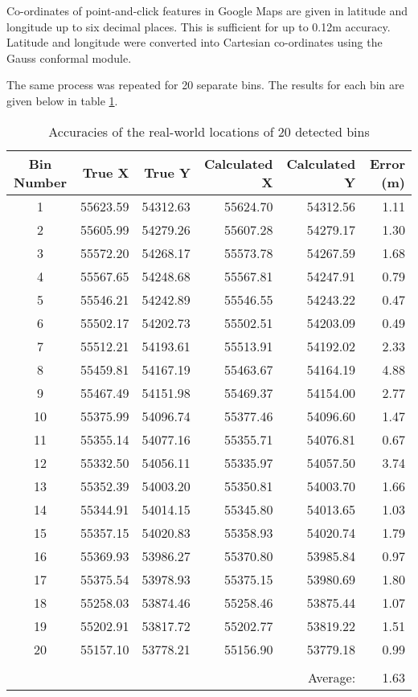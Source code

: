Co-ordinates of point-and-click features in Google Maps are given in latitude and longitude up to six decimal places. This is sufficient for up to 0.12m accuracy. Latitude and longitude were converted into Cartesian co-ordinates using the Gauss conformal module.

The same process was repeated for 20 separate bins. The results for each bin are given below in table \ref{tab:final_results}.

\begin{table}[H]
\caption[Final Results]{Accuracies of the real-world locations of 20 detected bins}
\label{tab:final_results}
\centering
\begin{tabular}{c r r r r r}
\toprule
\textbf{Bin Number} & \textbf{True X} & \textbf{True Y} & \textbf{Calculated X} & \textbf{Calculated Y} & \textbf{Error (m)} \\
\midrule
1 & 55623.59 & 54312.63 & 55624.70 & 54312.56 & 1.11 \\
2 & 55605.99 & 54279.26 & 55607.28 & 54279.17 & 1.30 \\
3 & 55572.20 & 54268.17 & 55573.78 & 54267.59 & 1.68 \\
4 & 55567.65 & 54248.68 & 55567.81 & 54247.91 & 0.79 \\
5 & 55546.21 & 54242.89 & 55546.55 & 54243.22 & 0.47 \\
6 & 55502.17 & 54202.73 & 55502.51 & 54203.09 & 0.49 \\
7 & 55512.21 & 54193.61 & 55513.91 & 54192.02 & 2.33 \\
8 & 55459.81 & 54167.19 & 55463.67 & 54164.19 & 4.88 \\
9 & 55467.49 & 54151.98 & 55469.37 & 54154.00 & 2.77 \\
10 & 55375.99 & 54096.74 & 55377.46 & 54096.60 & 1.47 \\
11 & 55355.14 & 54077.16 & 55355.71 & 54076.81 & 0.67 \\
12 & 55332.50 & 54056.11 & 55335.97 & 54057.50 & 3.74 \\
13 & 55352.39 & 54003.20 & 55350.81 & 54003.70 & 1.66 \\
14 & 55344.91 & 54014.15 & 55345.80 & 54013.65 & 1.03 \\
15 & 55357.15 & 54020.83 & 55358.93 & 54020.74 & 1.79 \\
16 & 55369.93 & 53986.27 & 55370.80 & 53985.84 & 0.97 \\
17 & 55375.54 & 53978.93 & 55375.15 & 53980.69 & 1.80 \\
18 & 55258.03 & 53874.46 & 55258.46 & 53875.44 & 1.07 \\
19 & 55202.91 & 53817.72 & 55202.77 & 53819.22 & 1.51 \\
20 & 55157.10 & 53778.21 & 55156.90 & 53779.18 & 0.99 \\
\bottomrule\\
& & & & Average: & 1.63 \\
\end{tabular}
\end{table}

